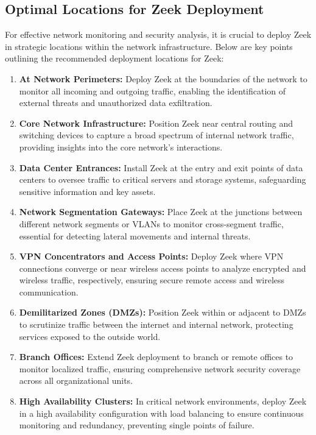 \subsection{Optimal Locations for Zeek Deployment}
For effective network monitoring and security analysis, it is crucial to deploy Zeek in strategic locations within the network infrastructure. Below are key points outlining the recommended deployment locations for Zeek:

\begin{enumerate}
    \item \textbf{At Network Perimeters:} Deploy Zeek at the boundaries of the network to monitor all incoming and outgoing traffic, enabling the identification of external threats and unauthorized data exfiltration.
    
    \item \textbf{Core Network Infrastructure:} Position Zeek near central routing and switching devices to capture a broad spectrum of internal network traffic, providing insights into the core network's interactions.
    
    \item \textbf{Data Center Entrances:} Install Zeek at the entry and exit points of data centers to oversee traffic to critical servers and storage systems, safeguarding sensitive information and key assets.
    
    \item \textbf{Network Segmentation Gateways:} Place Zeek at the junctions between different network segments or VLANs to monitor cross-segment traffic, essential for detecting lateral movements and internal threats.
    
    \item \textbf{VPN Concentrators and Access Points:} Deploy Zeek where VPN connections converge or near wireless access points to analyze encrypted and wireless traffic, respectively, ensuring secure remote access and wireless communication.
    
    \item \textbf{Demilitarized Zones (DMZs):} Position Zeek within or adjacent to DMZs to scrutinize traffic between the internet and internal network, protecting services exposed to the outside world.
    
    \item \textbf{Branch Offices:} Extend Zeek deployment to branch or remote offices to monitor localized traffic, ensuring comprehensive network security coverage across all organizational units.
    
    \item \textbf{High Availability Clusters:} In critical network environments, deploy Zeek in a high availability configuration with load balancing to ensure continuous monitoring and redundancy, preventing single points of failure.
\end{enumerate}
